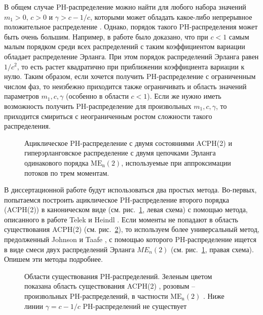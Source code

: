 В общем случае PH-распределение можно найти для любого набора значений $m_1 > 0$, $c > 0$ и $\gamma > c - 1/c$, которыми может обладать какое-либо непрерывное положительное распределение \cite{Johnson1989}. Однако, порядок такого PH-распределения может быть очень большим. Например, в работе \cite{Aldous1987} было доказано, что при $c < 1$ самым малым порядком среди всех распределений с таким коэффициентом вариации  обладает распределение Эрланга. При этом порядок распределений Эрланга равен $1 / c^2$, то есть растет квадратично при приближении коэффициента вариации к нулю. Таким образом, если хочется получить PH-распределение с ограниченным числом фаз, то неизбежно приходится также ограничивать и область значений параметров $m_1, c, \gamma$ (особенно в области $c < 1$). Если же нужно иметь возможность получить PH-распределение для произвольных $m_1, c, \gamma$, то приходится смириться с неограниченным ростом сложности такого распределения.

\begin{figure}[h]
  \caption{Ациклическое PH-распределение с двумя состояниями ACPH(2) и гиперэрланговское распределение с двумя цепочками Эрланга одинакового порядка $\text{ME}_\text{n}(2)$, используемые при аппроксимации потоков по трем моментам.}
  \label{fig:ch4_ph3}
\end{figure}

В диссертационной работе будут использоваться два простых метода. Во-первых, попытаемся построить ациклическое PH-распределение второго порядка (ACPH(2)) в каноническом виде (см. рис.~\ref{fig:ch4_ph3}, левая схема) с помощью метода, описанного в работе Telek и Heindl \cite{Telek2003}. Если моменты не попадают в область существования ACPH(2) (см. рис.~\ref{fig:ch4_ph_feasible_regions}), то используем более универсальный метод, предолженный Johnson и Taafe \cite{Johnson1989}, с помощью которого PH-распределение ищется в виде смеси двух распределений Эрланга $ME_n(2)$ (см. рис.~\ref{fig:ch4_ph3}, правая схема). Опишем эти методы подробнее.

\begin{figure}[h]
  \caption{Области существования PH-распределений. Зеленым цветом показана область существования ACPH(2) \cite{Telek2003}, розовым -- произвольных PH-распределений, в частности $\text{ME}_\text{n}(2)$ \cite{Johnson1989}. Ниже линии $\gamma = c - 1/c$ PH-распределений не существует}
  \label{fig:ch4_ph_feasible_regions}
\end{figure}

